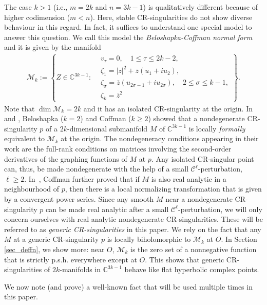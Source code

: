 \documentclass[10pt]{amsart}
\numberwithin{equation}{section}
\theoremstyle{definition}
\theoremstyle{definition}
\theoremstyle{plain}
\newcommand{\bea} {\begin{eqnarray}}
\newcommand{\eea} {\end{eqnarray}}
\newcommand{\bc}{\mathcal{M}}
\newcommand{\zbar}{\overline{z}}
\newcommand{\cont}{\mathcal{C}}
\newcommand{\C} {\mathbb{C}}
\begin{document}
The case $k>1$ (i.e., $m=2k$ and $n=3k-1$) is qualitatively different because of higher codimension ($m<n$). Here, stable CR-singularities do not show diverse behaviour in this regard. In fact, it suffices to understand one special model to answer this question. We call this model the {\em Beloshapka-Coffman normal form} and it is given by the manifold
	\bea\label{eq_BCform}
		\bc_k:=
\left\{Z\in\C^{3k-1}:
\begin{aligned}
&v_\tau=0,\quad 1\leq \tau\leq 2k-2,\\
&\zeta_{1}=|z|^2+\zbar(u_1+iu_2), \\
&\zeta_\sigma=\zbar(u_{2\sigma-1}+iu_{2\sigma}),\quad 2\leq \sigma\leq k-1, \\
&\zeta_k=\zbar^2
\end{aligned}
\right\}.
	\eea
Note that $\dim \bc_k=2k$ and it has an isolated CR-singularity at the origin. In~\cite{Be97} and \cite{Co97}, Beloshapka ($k=2$) and Coffman ($k\geq 2$) showed that a nondegenerate CR-singularity $p$ of a $2k$-dimensional submanifold $M$ of $\C^{3k-1}$ is locally {\em formally} equivalent to $\bc_k$ at the origin. The nondegeneracy conditions appearing in their work are the full-rank conditions on matrices involving the second-order derivatives of the graphing functions of $M$ at $p$. Any isolated CR-singular point can, thus, be made nondegenerate with the help of a small $\cont^\ell$-perturbation, $\ell\geq 2$.  In~\cite{Co06}, Coffman further proved that if $M$ is also real analytic in a neighbourhood of $p$, then there is a local normalizing transformation that is given by a convergent power series. Since any smooth $M$ near a nondegenerate CR-singularity $p$ can be made real analytic after a small $\cont^\ell$-perturbation, we will only concern ourselves with real analytic nondegenerate CR-singularities. These will be referred to as {\em generic CR-singularities} in this paper. We rely on the fact that any $M$ at a generic CR-singularity $p$ is locally biholomorphic to $\bc_k$ at $O$. In Section \ref{sec_deffn}, we show more: near $O$, $\bc_k$ is the zero set of a nonnegative function that is strictly p.s.h. everywhere except at $O$. This shows that generic CR-singularities of $2k$-manifolds in $\C^{3k-1}$ behave like flat hyperbolic complex points.

We now note (and prove) a well-known fact that will be used multiple times in this paper. 
\end{document}
